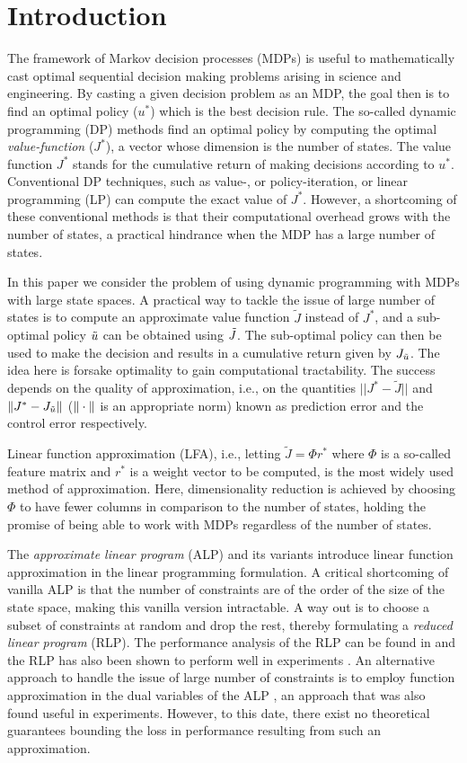 \section{Introduction}
The  framework of Markov decision processes (MDPs) is useful to mathematically cast optimal sequential decision making problems arising in science and engineering. By casting a given decision problem as an MDP, the goal then is to find an optimal policy ($u^*$) which is the best decision rule. The so-called dynamic programming (DP) methods find an optimal policy by computing the optimal \emph{value-function} ($J^*$), a vector whose dimension is the number of states. The value function $J^*$ stands for the cumulative return of making decisions according to $u^*$. Conventional DP  techniques, such as value-, or policy-iteration, or linear programming (LP) \cite{BertB} can compute the exact value of $J^*$. However, a shortcoming of these conventional methods is that their computational overhead grows with the number of states, a practical hindrance when the MDP has a large number of states.\par
In this paper we consider the problem of using dynamic programming with MDPs with large state spaces. A practical way to tackle the issue of large number of states is to compute an approximate value function $\tilde{J}$ instead of $J^*$, and a sub-optimal policy $\tilde{u}$ can be obtained using $\tilde{J}$. The sub-optimal policy can then be used to make the decision and results in a cumulative return given by $J_{\tilde{u}}$. The idea here is forsake optimality to gain computational tractability. The success depends on the quality of approximation, i.e., on the quantities $||J^*-\tilde{J}||$ and $\|J^*-J_{\tilde{u}}\|$ ($\|\cdot\|$ is an appropriate norm) known as prediction error and the control error respectively.\par
Linear function approximation (LFA), i.e., letting $\tilde{J}=\Phi r^*$ where $\Phi$ is a so-called feature matrix and $r^*$ is a weight vector to be computed, is the most widely used method of approximation. Here, dimensionality reduction is achieved by choosing $\Phi$ to have fewer columns in comparison to the number of states, holding the promise of being able to work with MDPs regardless of the number of states.\par
The \emph{approximate linear program} (ALP) \cite{ALP,CS,SALP,ALP-Bor} and its variants introduce linear function approximation in the linear programming formulation. A critical shortcoming of vanilla ALP is that the number of constraints are of the order of the size of the state space, making this vanilla version intractable. A way out is to choose a subset of constraints at random and drop the rest, thereby formulating a \emph{reduced linear program} (RLP). The performance analysis of the RLP can be found in \cite{CS} and the RLP has also been shown to perform well in experiments \cite{ALP,CS,CST}. An alternative approach to handle the issue of large number of constraints is to employ function approximation in the dual variables of the ALP \cite{ALP-Bor,dolgov}, an approach that was also found useful in experiments. However, to this date, there exist no theoretical guarantees bounding the loss in performance resulting from such an approximation.
